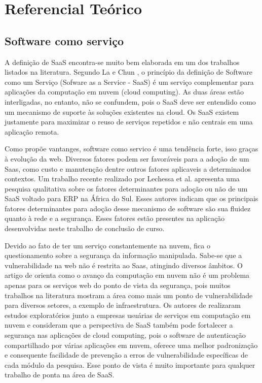 \chapter{Referencial Teórico}


 \section{Software como serviço}\label{sec:saas}


A definição de SaaS encontra-se muito bem elaborada em um dos trabalhos listados na literatura. Segundo La e Chun \citep{La2009Systematic}, o princípio da definição de Software como um Serviço (Sofware as a Service - SaaS) é um serviço complementar para aplicações da computação em nuvem (cloud computing). As duas áreas estão interligadas, no entanto, não se confundem, pois o SaaS deve ser entendido como um mecanismo de suporte às soluções existentes na cloud. Os SaaS existem justamente para maximizar o reuso de serviços repetidos e não centrais em uma aplicação remota.


Como propõe vantanges, software como servico é uma tendência forte, isso graças à evolução da web. Diversos fatores podem ser favoráveis para a adoção de um Saas, como custo e manutenção dentre outros fatores aplicaveis a determinados contextos. Um trabalho recente realizado por Lechessa et al. \cite{LechesaSS11} apresenta uma pesquisa qualitativa sobre os fatores determinantes para adoção ou não de um SaaS voltado para ERP na África do Sul. Esses autores indicam que os principais fatores determinantes para adoção desse mecanismo de software são sua fluidez quanto à rede e a segurança. Esses fatores estão presentes na aplicação desenvolvidas neste trabalho de conclusão de curso.
 

Devido ao fato de ter um serviço constantemente na nuvem, fica o questionamento sobre a segurança da informação manipulada. Sabe-se que a vulnerabilidade na web não é restrita ao Saas, atingindo diversos âmbitos. O artigo de \citep{journals/corr/RaiSM13} orienta como o avanço da computação em nuvem não é um problema apenas para os serviços web do ponto de vista da segurança, pois muitos trabalhos na literatura mostram a área como mais um ponto de vulnerabilidade para diversos setores, a exemplo de infraestrutura. Os autores de \citep{journals/corr/RaiSM13} realizaram estudos exploratórios junto a empresas usuárias de serviços em computação em nuvem e consideram que a perspectiva de SaaS também pode fortalecer a segurança nas aplicações de cloud computing, pois o software de autenticação compartilhado por várias aplicações em nuvem, oferece uma melhor padronização e consequente facilidade de prevenção a erros de vulnerabilidade específicas de cada módulo da pesquisa. Esse ponto de vista é muito importante para qualquer trabalho de ponta na área de SaaS.


